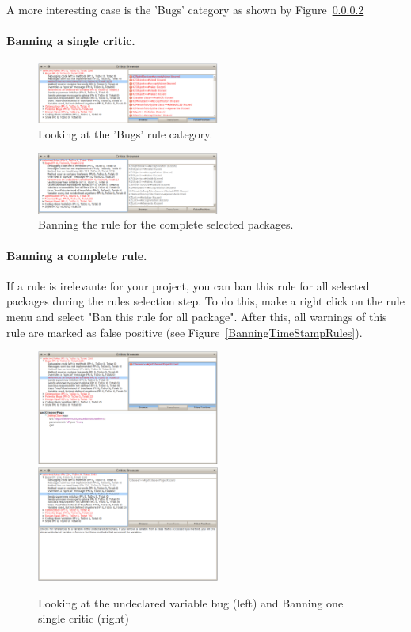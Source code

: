 \documentclass[a4paper,10pt,twoside]{book}
\begin{document}
A more interesting case is the 'Bugs' category as shown by Figure~\ref{}


\paragraph{Banning a single critic.}


\begin{figure}[h]
\centering
\includegraphics[width=6cm]{LookingAtBugs}
\caption{Looking at the 'Bugs' rule category.}
\end{figure}


\begin{figure}[h]
\centering
\includegraphics[width=6cm]{BanningTimeStampRules}
\caption{Banning the rule for the complete selected packages.}
\end{figure}


\paragraph{Banning a complete rule.}
If a rule is irelevante for your project, you can ban this rule for all selected packages during the rules selection step. To do this, make a right click on the rule menu and select "Ban this rule for all package". After this, all  warnings of this rule are marked as false positive (see Figure~\ref{BanningTimeStampRules}). 



\begin{figure}[h]
\centering
\includegraphics[width=6cm]{OneUndeclaredRefence}\includegraphics[width=6cm]{BanningOneViolation}
\caption{Looking at the undeclared variable bug (left) and Banning one single critic (right)}
\end{figure}
\end{document}

